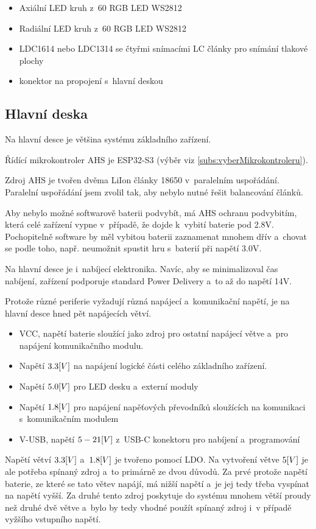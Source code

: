 \begin{itemize}
    \item Axiální LED kruh z~60 RGB LED WS2812
    \item Radiální LED kruh z~60 RGB LED WS2812
    \item LDC1614 nebo LDC1314 se čtyřmi snímacími LC články pro snímání tlakové plochy
    \item konektor na propojení s~hlavní deskou
\end{itemize}

\subsection{Hlavní deska}
Na hlavní desce je většina systému základního zařízení.

Řídící mikrokontroler AHS je ESP32-S3 (výběr viz \ref{subs:vyberMikrokontroleru}).

Zdroj AHS je tvořen dvěma LiIon články 18650 v~paralelním uspořádání.
Paralelní uspořádání jsem zvolil tak, aby nebylo nutné řešit balancování článků.

Aby nebylo možné softwarově baterii podvybít, má AHS ochranu podvybitím, která celé zařízení vypne v~případě, že dojde k~vybití baterie pod 2.8V.
Pochopitelně software by měl vybitou baterii zaznamenat mnohem dřív a~chovat se podle toho, např. neumožnit spustit hru s~baterií při napětí 3.0V.

Na hlavní desce je i~nabíjecí elektronika.
Navíc, aby se minimalizoval čas nabíjení, zařízení podporuje standard Power Delivery a~to až do napětí 14V.

Protože různé periferie vyžadují různá napájecí a~komunikační napětí, je na hlavní desce hned pět napájecích větví.
\begin{itemize}
    \item VCC, napětí baterie sloužící jako zdroj pro ostatní napájecí větve a~pro napájení komunikačního modulu. 
    \item Napětí \(3.3\-[V]\) na napájení logické části celého základního zařízení.
    \item Napětí \(5.0\-[V]\) pro LED desku a~externí moduly
    \item Napětí \(1.8\-[V]\) pro napájení napěťových převodníků sloužících na komunikaci s~komunikačním modulem 
    \item V-USB, napětí \(5\- - \-21\-[V]\) z~USB-C konektoru pro nabíjení a~programování
\end{itemize}
Napětí větví \(3.3\-[V]\) a~\(1.8\-[V]\) je tvořeno pomocí LDO.
Na vytvoření větve \(5\-[V]\) je ale potřeba spínaný zdroj a~to primárně ze dvou důvodů.
Za prvé protože napětí baterie, ze které se tato větev napájí, má nižší napětí a~je jej tedy třeba vyspínat na napětí vyšší.
Za druhé tento zdroj poskytuje do systému mnohem větší proudy než druhé dvě větve a~bylo by tedy vhodné použít spínaný zdroj i~v případě vyžšího vstupního napětí.

